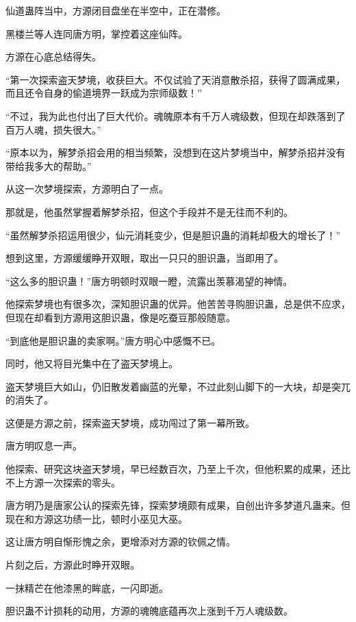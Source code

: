 
\begin{this_body}



仙道蛊阵当中，方源闭目盘坐在半空中，正在潜修。

黑楼兰等人连同唐方明，掌控着这座仙阵。

方源在心底总结得失。

“第一次探索盗天梦境，收获巨大。不仅试验了天消意散杀招，获得了圆满成果，而且还令自身的偷道境界一跃成为宗师级数！”

“不过，我为此也付出了巨大代价。魂魄原本有千万人魂级数，但现在却跌落到了百万人魂，损失很大。”

“原本以为，解梦杀招会用的相当频繁，没想到在这片梦境当中，解梦杀招并没有带给我多大的帮助。”

从这一次梦境探索，方源明白了一点。

那就是，他虽然掌握着解梦杀招，但这个手段并不是无往而不利的。

“虽然解梦杀招运用很少，仙元消耗变少，但是胆识蛊的消耗却极大的增长了！”

想到这里，方源缓缓睁开双眼，取出一只只的胆识蛊，当即用了。

“这么多的胆识蛊！”唐方明顿时双眼一瞪，流露出羡慕渴望的神情。

他探索梦境也有很多次，深知胆识蛊的优异。他苦苦寻购胆识蛊，总是供不应求，但现在却看到方源用这胆识蛊，像是吃蚕豆那般随意。

“到底他是胆识蛊的卖家啊。”唐方明心中感慨不已。

同时，他又将目光集中在了盗天梦境上。

盗天梦境巨大如山，仍旧散发着幽蓝的光晕，不过此刻山脚下的一大块，却是突兀的消失了。

这便是方源之前，探索盗天梦境，成功闯过了第一幕所致。

唐方明叹息一声。

他探索、研究这块盗天梦境，早已经数百次，乃至上千次，但他积累的成果，还比不上方源一次探索的零头。

唐方明乃是唐家公认的探索先锋，探索梦境颇有成果，自创出许多梦道凡蛊来。但现在和方源这功绩一比，顿时小巫见大巫。

这让唐方明自惭形愧之余，更增添对方源的钦佩之情。

片刻之后，方源此时睁开双眼。

一抹精芒在他漆黑的眸底，一闪即逝。

胆识蛊不计损耗的动用，方源的魂魄底蕴再次上涨到千万人魂级数。


\end{this_body}
